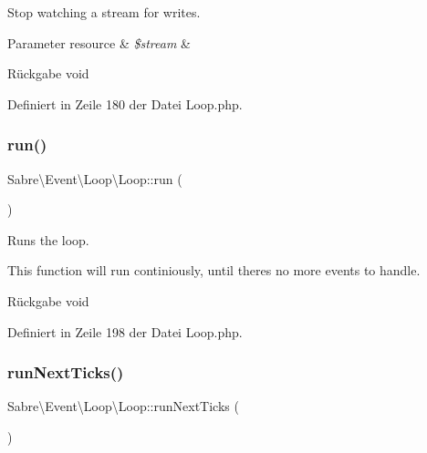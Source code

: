 Stop watching a stream for writes.


\begin{DoxyParams}[1]{Parameter}
resource & {\em \$stream} & \\
\hline
\end{DoxyParams}
\begin{DoxyReturn}{Rückgabe}
void 
\end{DoxyReturn}


Definiert in Zeile 180 der Datei Loop.\+php.

\mbox{\label{class_sabre_1_1_event_1_1_loop_1_1_loop_a78cbef0bbe4c97ae0d1f63dbbeb2a066}} 
\subsubsection{\texorpdfstring{run()}{run()}}
{\footnotesize\ttfamily Sabre\textbackslash{}\+Event\textbackslash{}\+Loop\textbackslash{}\+Loop\+::run (\begin{DoxyParamCaption}{ }\end{DoxyParamCaption})}

Runs the loop.

This function will run continiously, until there\textquotesingle{}s no more events to handle.

\begin{DoxyReturn}{Rückgabe}
void 
\end{DoxyReturn}


Definiert in Zeile 198 der Datei Loop.\+php.

\mbox{\label{class_sabre_1_1_event_1_1_loop_1_1_loop_a0817ff51d002d3a190ca40dd64c21975}} 
\subsubsection{\texorpdfstring{run\+Next\+Ticks()}{runNextTicks()}}
{\footnotesize\ttfamily Sabre\textbackslash{}\+Event\textbackslash{}\+Loop\textbackslash{}\+Loop\+::run\+Next\+Ticks (\begin{DoxyParamCaption}{ }\end{DoxyParamCaption})\hspace{0.3cm}{\ttfamily [protected]}}

